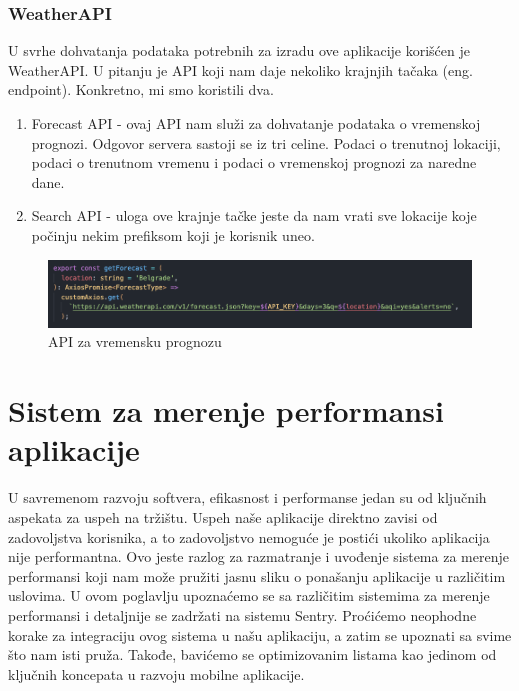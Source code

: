 \documentclass[12pt,oneside]{memoir}
\begin{document}
\subsection{WeatherAPI}

U svrhe dohvatanja podataka potrebnih za izradu ove aplikacije korišćen je WeatherAPI. U pitanju je API koji nam daje nekoliko krajnjih tačaka (eng. endpoint). Konkretno, mi smo koristili dva. 

\begin{enumerate}
    \item Forecast API - ovaj API nam služi za dohvatanje podataka o vremenskoj prognozi. Odgovor servera sastoji se iz tri celine. Podaci o trenutnoj lokaciji, podaci o trenutnom vremenu i podaci o vremenskoj prognozi za naredne dane.
    \item Search API - uloga ove krajnje tačke jeste da nam vrati sve lokacije koje počinju nekim prefiksom koji je korisnik uneo. 
\end{enumerate}

\newpage

\begin{figure}[h]
    \centering
    \includegraphics[scale=0.5]{docs/images/chapterFour/forecastAPI.png}
    \caption{API za vremensku prognozu}
    \label{fig:forecastAPI}
\end{figure}

\chapter{Sistem za merenje performansi aplikacije}

U savremenom razvoju softvera, efikasnost i performanse jedan su od ključnih aspekata za uspeh na tržištu. Uspeh naše aplikacije direktno zavisi od zadovoljstva korisnika, a to zadovoljstvo nemoguće je postići ukoliko aplikacija nije performantna. Ovo jeste razlog za razmatranje i uvođenje sistema za merenje performansi koji nam može pružiti jasnu sliku o ponašanju aplikacije u različitim uslovima. 
\newline
U ovom poglavlju upoznaćemo se sa različitim sistemima za merenje performansi i detaljnije se zadržati na sistemu Sentry. Proćićemo neophodne korake za integraciju ovog sistema u našu aplikaciju, a zatim se upoznati sa svime što nam isti pruža. Takođe, bavićemo se optimizovanim listama kao jedinom od ključnih koncepata u razvoju mobilne aplikacije.
\end{document}

